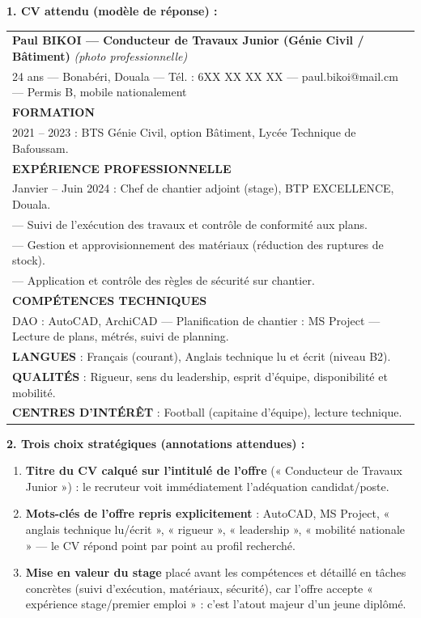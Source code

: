 \documentclass[11pt]{article}
\begin{document}
\begin{corrige}
\textbf{1. CV attendu (modèle de réponse) :}
\begin{center}
\begin{tabularx}{\linewidth}{|X|}
\hline
\textbf{Paul BIKOI — Conducteur de Travaux Junior (Génie Civil / Bâtiment)} \hfill \textit{(photo professionnelle)} \\
24 ans — Bonabéri, Douala — Tél. : 6XX XX XX XX — paul.bikoi@mail.cm — Permis B, mobile nationalement \\
\hline
\textbf{FORMATION} \\
2021 -- 2023 : BTS Génie Civil, option Bâtiment, Lycée Technique de Bafoussam. \\
\hline
\textbf{EXPÉRIENCE PROFESSIONNELLE} \\
Janvier -- Juin 2024 : Chef de chantier adjoint (stage), BTP EXCELLENCE, Douala. \\
— Suivi de l'exécution des travaux et contrôle de conformité aux plans. \\
— Gestion et approvisionnement des matériaux (réduction des ruptures de stock). \\
— Application et contrôle des règles de sécurité sur chantier. \\
\hline
\textbf{COMPÉTENCES TECHNIQUES} \\
DAO : AutoCAD, ArchiCAD — Planification de chantier : MS Project — Lecture de plans, métrés, suivi de planning. \\
\hline
\textbf{LANGUES} : Français (courant), Anglais technique lu et écrit (niveau B2). \\
\textbf{QUALITÉS} : Rigueur, sens du leadership, esprit d'équipe, disponibilité et mobilité. \\
\textbf{CENTRES D'INTÉRÊT} : Football (capitaine d'équipe), lecture technique. \\
\hline
\end{tabularx}
\end{center}

\textbf{2. Trois choix stratégiques (annotations attendues) :}
\begin{enumerate}
\item \textbf{Titre du CV calqué sur l'intitulé de l'offre} (« Conducteur de Travaux Junior ») : le recruteur voit immédiatement l'adéquation candidat/poste.
\item \textbf{Mots-clés de l'offre repris explicitement} : AutoCAD, MS Project, « anglais technique lu/écrit », « rigueur », « leadership », « mobilité nationale » — le CV répond point par point au profil recherché.
\item \textbf{Mise en valeur du stage} placé avant les compétences et détaillé en tâches concrètes (suivi d'exécution, matériaux, sécurité), car l'offre accepte « expérience stage/premier emploi » : c'est l'atout majeur d'un jeune diplômé.
\end{enumerate}


\end{corrige}
\end{document}
